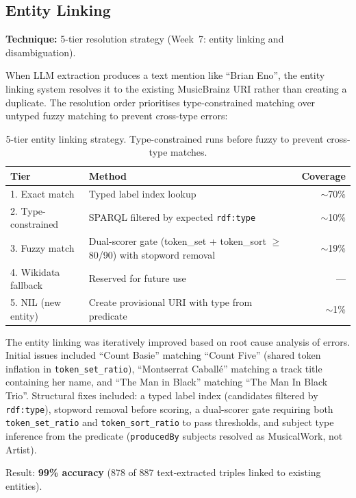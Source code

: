 \documentclass[11pt,a4paper]{article}
\begin{document}
\subsection{Entity Linking}

\textbf{Technique:} 5-tier resolution strategy (Week~7: entity linking and disambiguation).

When LLM extraction produces a text mention like ``Brian Eno'', the entity linking system resolves it to the existing MusicBrainz URI rather than creating a duplicate. The resolution order prioritises type-constrained matching over untyped fuzzy matching to prevent cross-type errors:

\begin{table}[h]
\centering
\small
\begin{tabular}{llr}
\toprule
\textbf{Tier} & \textbf{Method} & \textbf{Coverage} \\
\midrule
1. Exact match & Typed label index lookup & $\sim$70\% \\
2. Type-constrained & SPARQL filtered by expected \texttt{rdf:type} & $\sim$10\% \\
3. Fuzzy match & Dual-scorer gate (token\_set + token\_sort $\geq$ 80/90) with stopword removal & $\sim$19\% \\
4. Wikidata fallback & Reserved for future use & --- \\
5. NIL (new entity) & Create provisional URI with type from predicate & $\sim$1\% \\
\bottomrule
\end{tabular}
\caption{5-tier entity linking strategy. Type-constrained runs before fuzzy to prevent cross-type matches.}
\end{table}

The entity linking was iteratively improved based on root cause analysis of errors. Initial issues included ``Count Basie'' matching ``Count Five'' (shared token inflation in \texttt{token\_set\_ratio}), ``Montserrat Caball\'{e}'' matching a track title containing her name, and ``The Man in Black'' matching ``The Man In Black Trio''. Structural fixes included: a typed label index (candidates filtered by \texttt{rdf:type}), stopword removal before scoring, a dual-scorer gate requiring both \texttt{token\_set\_ratio} and \texttt{token\_sort\_ratio} to pass thresholds, and subject type inference from the predicate (\texttt{producedBy} subjects resolved as MusicalWork, not Artist).

Result: \textbf{99\% accuracy} (878 of 887 text-extracted triples linked to existing entities).
\end{document}
